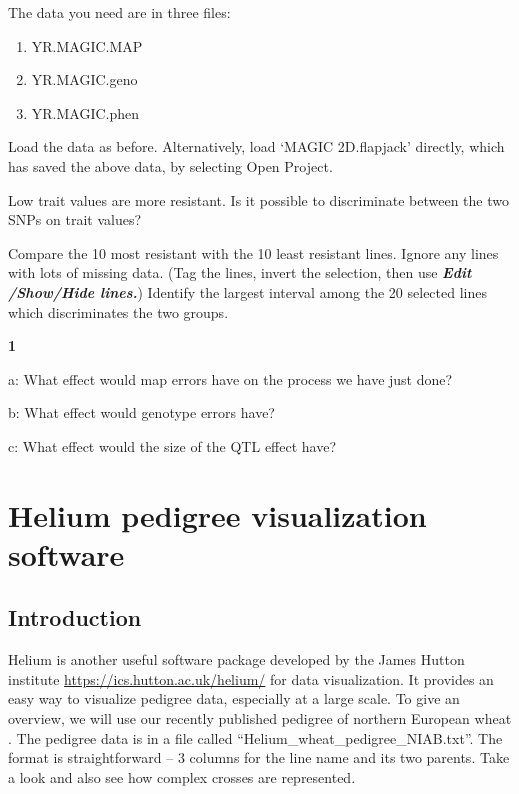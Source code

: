 \documentclass[
]{book}
\makeatletter
\providecommand{\tightlist}{%
  \setlength{\itemsep}{0pt}\setlength{\parskip}{0pt}}
\newenvironment{kframe}{%
\medskip{}
\setlength{\fboxsep}{.8em}
 \def\at@end@of@kframe{}%
 \ifinner\ifhmode%
  \def\at@end@of@kframe{\end{minipage}}%
  \begin{minipage}{\columnwidth}%
 \fi\fi%
 \def\FrameCommand##1{\hskip\@totalleftmargin \hskip-\fboxsep
 \colorbox{shadecolor}{##1}\hskip-\fboxsep
     \hskip-\linewidth \hskip-\@totalleftmargin \hskip\columnwidth}%
 \MakeFramed {\advance\hsize-\width
   \@totalleftmargin\z@ \linewidth\hsize
   \@setminipage}}%
 {\par\unskip\endMakeFramed%
 \at@end@of@kframe}
\newenvironment{rmdblock}[1]
  {
  \begin{itemize}
  \renewcommand{\labelitemi}{
    \raisebox{-.7\height}[0pt][0pt]{
      {\setkeys{Gin}{width=3em,keepaspectratio}\texttt{[image: images/\#1]}}
    }
  }
  \setlength{\fboxsep}{1em}
  \begin{kframe}
  \item
  }
  {
  \end{kframe}
  \end{itemize}
  }
\newenvironment{rmdquiz}
  {\begin{rmdblock}{quiz}}
  {\end{rmdblock}}
\makeatother
\begin{document}
The data you need are in three files:

\begin{enumerate}
\def\labelenumi{\arabic{enumi}.}
\tightlist
\item
  YR.MAGIC.MAP
\item
  YR.MAGIC.geno
\item
  YR.MAGIC.phen
\end{enumerate}

Load the data as before. Alternatively, load `MAGIC 2D.flapjack' directly, which has saved the above data, by selecting Open Project.

Low trait values are more resistant. Is it possible to discriminate between the two SNPs on trait values?

Compare the 10 most resistant with the 10 least resistant lines. Ignore any lines with lots of missing data. (Tag the lines, invert the selection, then use \textbf{\emph{Edit /Show/Hide lines.}}) Identify the largest interval among the 20 selected lines which discriminates the two groups.

\begin{rmdquiz}
\textbf{1}

a: What effect would map errors have on the process we have just done?

b: What effect would genotype errors have?

c: What effect would the size of the QTL effect have?
\end{rmdquiz}

\hypertarget{helium-pedigree-visualization-software}{%
\section{Helium pedigree visualization software}\label{helium-pedigree-visualization-software}}

\hypertarget{introduction-3}{%
\subsection{Introduction}\label{introduction-3}}

Helium is another useful software package developed by the James Hutton institute \url{https://ics.hutton.ac.uk/helium/} for data visualization. It provides an easy way to visualize pedigree data, especially at a large scale. To give an overview, we will use our recently published pedigree of northern European wheat \citep{Fradgley2019}. The pedigree data is in a file called ``Helium\_wheat\_pedigree\_NIAB.txt''. The format is straightforward -- 3 columns for the line name and its two parents. Take a look and also see how complex crosses are represented.
\end{document}

